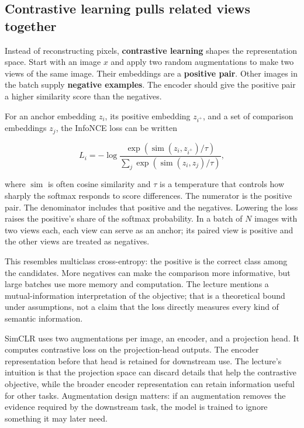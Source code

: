 \subsection{Contrastive learning pulls related views together}\label{04-visual-computing-ii-ch031-contrastive-learning-pulls-related-views-together}

\hypertarget{04-visual-computing-ii-ch031-contrastive-learning-pulls-related-views-together}{}

Instead of reconstructing pixels, \textbf{contrastive learning} shapes the representation space. Start with an image \(x\) and apply two random augmentations to make two views of the same image. Their embeddings are a \textbf{positive pair}. Other images in the batch supply \textbf{negative examples}. The encoder should give the positive pair a higher similarity score than the negatives.

For an anchor embedding \(z_i\), its positive embedding \(z_{i^+}\), and a set of comparison embeddings \(z_j\), the InfoNCE loss can be written

\[
L_i=-\log\frac{\exp(\operatorname{sim}(z_i,z_{i^+})/\tau)}
{\sum_j\exp(\operatorname{sim}(z_i,z_j)/\tau)},
\]

where \(\operatorname{sim}\) is often cosine similarity and \(\tau\) is a temperature that controls how sharply the softmax responds to score differences. The numerator is the positive pair. The denominator includes that positive and the negatives. Lowering the loss raises the positive's share of the softmax probability. In a batch of \(N\) images with two views each, each view can serve as an anchor; its paired view is positive and the other views are treated as negatives.

This resembles multiclass cross-entropy: the positive is the correct class among the candidates. More negatives can make the comparison more informative, but large batches use more memory and computation. The lecture mentions a mutual-information interpretation of the objective; that is a theoretical bound under assumptions, not a claim that the loss directly measures every kind of semantic information.

SimCLR uses two augmentations per image, an encoder, and a projection head. It computes contrastive loss on the projection-head outputs. The encoder representation before that head is retained for downstream use. The lecture's intuition is that the projection space can discard details that help the contrastive objective, while the broader encoder representation can retain information useful for other tasks. Augmentation design matters: if an augmentation removes the evidence required by the downstream task, the model is trained to ignore something it may later need.

